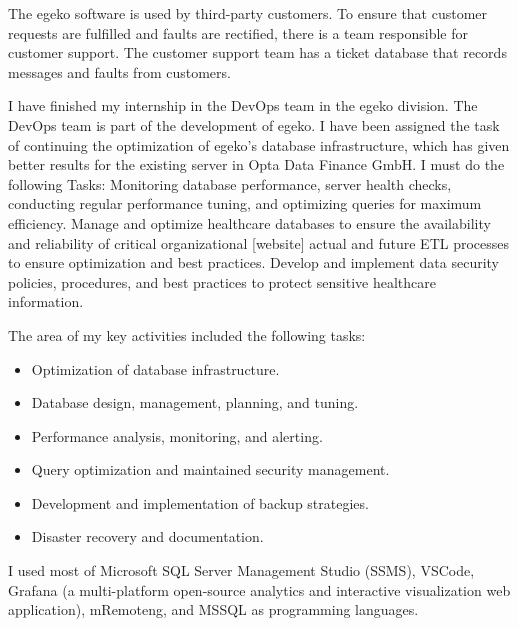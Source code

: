 The egeko software is used by third-party customers. To ensure that customer requests are fulfilled and faults are rectified, there is a team responsible for customer support. The customer support team has a ticket database that records messages and faults from customers.\vspace{.4cm}

I have finished my internship in the DevOps team in the egeko division. The DevOps team is part of the development of egeko. I have been assigned the task of continuing the optimization of egeko's database infrastructure, which has given better results for the existing server in Opta Data Finance GmbH. I must do the following Tasks: Monitoring database performance, server health checks, conducting regular performance tuning, and optimizing queries for maximum efficiency. Manage and optimize healthcare databases to ensure the availability and reliability of critical organizational [website] actual and future ETL processes to ensure optimization and best practices. Develop and implement data security policies, procedures, and best practices to protect sensitive healthcare information.\vspace{.4cm}

The area of my key activities included the following tasks:
\begin{itemize}
    \item Optimization of database infrastructure.
    \item Database design, management, planning, and tuning.
    \item Performance analysis, monitoring, and alerting.
    \item Query optimization and maintained security management.
    \item Development and implementation of backup strategies.
    \item Disaster recovery and documentation.
\end{itemize}
I used most of Microsoft SQL Server Management Studio (SSMS), VSCode, Grafana (a multi-platform open-source analytics and interactive visualization web application), mRemoteng, and MSSQL as programming languages.

